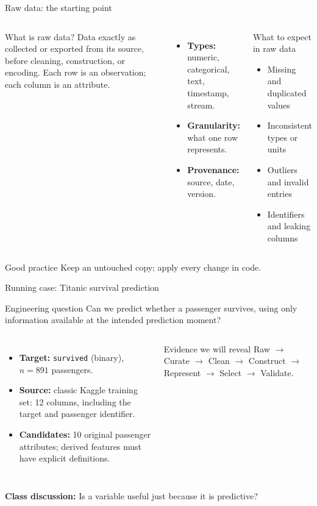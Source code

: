 \begin{frame}{Raw data: the starting point}
\begin{columns}[T]
\begin{block}{What is raw data?}\small
Data exactly as collected or exported from its source, before cleaning, construction, or encoding. Each row is an observation; each column is an attribute.
\end{block}
\begin{itemize}\small
\item \textbf{Types:} numeric, categorical, text, timestamp, stream.
\item \textbf{Granularity:} what one row represents.
\item \textbf{Provenance:} source, date, version.
\end{itemize}
\begin{block}{What to expect in raw data}\small
\begin{itemize}
\item Missing and duplicated values
\item Inconsistent types or units
\item Outliers and invalid entries
\item Identifiers and leaking columns
\end{itemize}
\end{block}
\end{columns}
\vspace{-0.2em}
\begin{alertblock}{Good practice}\small
Keep an untouched copy; apply every change in code.
\end{alertblock}
\coursefooter
\end{frame}
\begin{frame}{Running case: Titanic survival prediction}
\begin{block}{Engineering question}
Can we predict whether a passenger survives, using only information available at the intended prediction moment?
\end{block}
\begin{columns}[T]
\begin{itemize}\small
\item \textbf{Target:} \texttt{survived} (binary), $n=891$ passengers.
\item \textbf{Source:} classic Kaggle training set: 12 columns, including the target and passenger identifier.
\item \textbf{Candidates:} 10 original passenger attributes; derived features must have explicit definitions.
\end{itemize}
\begin{block}{Evidence we will reveal}\small
Raw $\rightarrow$ Curate $\rightarrow$ Clean $\rightarrow$ Construct $\rightarrow$ Represent $\rightarrow$ Select $\rightarrow$ Validate.
\end{block}
\end{columns}
\vspace{0.3em}
\textbf{Class discussion:} Is a variable useful just because it is predictive?
\coursefooter
\end{frame}

